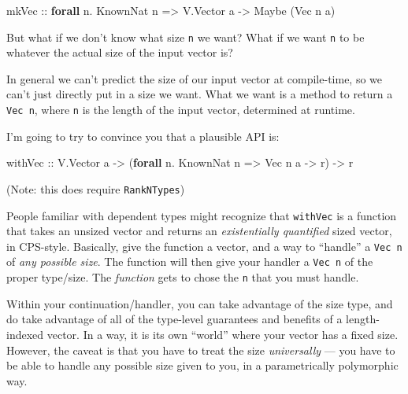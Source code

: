 \documentclass[]{article}
\newenvironment{Shaded}{}{}
\newcommand{\DataTypeTok}[1]{\textcolor[rgb]{0.56,0.13,0.00}{#1}}
\newcommand{\KeywordTok}[1]{\textcolor[rgb]{0.00,0.44,0.13}{\textbf{#1}}}
\newcommand{\NormalTok}[1]{#1}
\newcommand{\OperatorTok}[1]{\textcolor[rgb]{0.40,0.40,0.40}{#1}}
\newcommand{\OtherTok}[1]{\textcolor[rgb]{0.00,0.44,0.13}{#1}}
\begin{document}
\begin{Shaded}
\begin{Highlighting}[]
\OtherTok{mkVec ::} \KeywordTok{forall}\NormalTok{ n}\OperatorTok{.} \DataTypeTok{KnownNat}\NormalTok{ n }\OtherTok{=>} \DataTypeTok{V.Vector}\NormalTok{ a }\OtherTok{{-}>} \DataTypeTok{Maybe}\NormalTok{ (}\DataTypeTok{Vec}\NormalTok{ n a)}
\end{Highlighting}
\end{Shaded}

But what if we don't know what size \texttt{n} we want? What if we want
\texttt{n} to be whatever the actual size of the input vector is?

In general we can't predict the size of our input vector at compile-time, so we
can't just directly put in a size we want. What we want is a method to return a
\texttt{Vec\ n}, where \texttt{n} is the length of the input vector, determined
at runtime.

I'm going to try to convince you that a plausible API is:

\begin{Shaded}
\begin{Highlighting}[]
\NormalTok{withVec}
\OtherTok{    ::} \DataTypeTok{V.Vector}\NormalTok{ a}
    \OtherTok{{-}>}\NormalTok{ (}\KeywordTok{forall}\NormalTok{ n}\OperatorTok{.} \DataTypeTok{KnownNat}\NormalTok{ n }\OtherTok{=>} \DataTypeTok{Vec}\NormalTok{ n a }\OtherTok{{-}>}\NormalTok{ r)}
    \OtherTok{{-}>}\NormalTok{ r}
\end{Highlighting}
\end{Shaded}

(Note: this does require \texttt{RankNTypes})

People familiar with dependent types might recognize that \texttt{withVec} is a
function that takes an unsized vector and returns an \emph{existentially
quantified} sized vector, in CPS-style. Basically, give the function a vector,
and a way to ``handle'' a \texttt{Vec\ n} of \emph{any possible size}. The
function will then give your handler a \texttt{Vec\ n} of the proper type/size.
The \emph{function} gets to chose the \texttt{n} that you must handle.

Within your continuation/handler, you can take advantage of the size type, and
do take advantage of all of the type-level guarantees and benefits of a
length-indexed vector. In a way, it is its own ``world'' where your vector has a
fixed size. However, the caveat is that you have to treat the size
\emph{universally} --- you have to be able to handle any possible size given to
you, in a parametrically polymorphic way.
\end{document}
